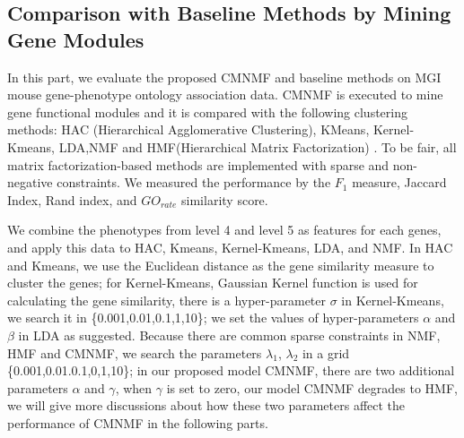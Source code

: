 \documentclass{bmcart}
\begin{document}

\subsection*{\textbf{Comparison with Baseline Methods by Mining Gene Modules}}
In this part, we evaluate the proposed CMNMF and baseline methods on MGI mouse gene-phenotype ontology association data.
CMNMF is executed to mine gene functional modules and it is compared with the following clustering methods: HAC (Hierarchical Agglomerative Clustering)\cite{Ward1963}, KMeans, Kernel-Kmeans\cite{Dhillon2004}, LDA\cite{Blei2003},NMF\cite{Mika1999} and HMF(Hierarchical Matrix Factorization) \cite{AliMashhoori2012}. To be fair, all matrix factorization-based methods are implemented with sparse and non-negative constraints. We measured the performance by the $F_1$ measure, Jaccard Index, Rand index, and $GO_{rate}$ similarity score.

We combine the phenotypes from level 4 and level 5 as features for each genes, and apply this data to HAC, Kmeans, Kernel-Kmeans, LDA, and NMF. In HAC and Kmeans, we use the Euclidean distance as the gene similarity measure to cluster the genes; for Kernel-Kmeans, Gaussian Kernel function is used for calculating the gene similarity, there is a hyper-parameter $\sigma$ in Kernel-Kmeans, we search it in \{0.001,0.01,0.1,1,10\}; we set the values of hyper-parameters $\alpha$ and $\beta$ in LDA as \cite{Wei2006} suggested. Because there are common sparse constraints in NMF, HMF and CMNMF, we search the parameters $\lambda_1$, $\lambda_2$ in a grid \{0.001,0.01.0.1,0,1,10\}; in our proposed model CMNMF, there are two additional parameters $\alpha$ and $\gamma$, when $\gamma$ is set to zero, our model CMNMF degrades to HMF, we will give more discussions about how these two parameters affect the performance of CMNMF in the following parts.
\end{document}

